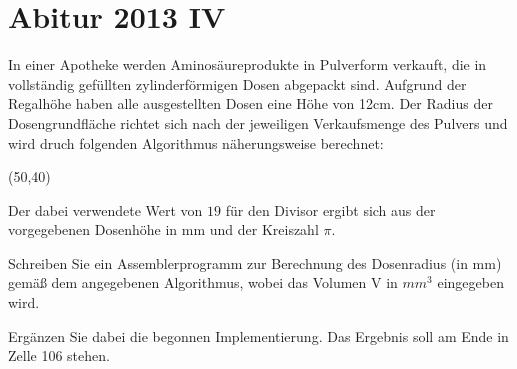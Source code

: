 \documentclass{lehramt-informatik-aufgabe}
\begin{document}

\section{Abitur 2013 IV}

In einer Apotheke werden Aminosäureprodukte in Pulverform verkauft, die
in vollständig gefüllten zylinderförmigen Dosen abgepackt sind. Aufgrund
der Regalhöhe haben alle ausgestellten Dosen eine Höhe von 12cm. Der
Radius der Dosengrundfläche richtet sich nach der jeweiligen
Verkaufsmenge des Pulvers und wird druch folgenden Algorithmus
näherungsweise berechnet:

\begin{struktogramm}(50,40)
  \whileend
{}
\end{struktogramm}

Der dabei verwendete Wert von $19$ für den Divisor ergibt sich aus der
vorgegebenen Dosenhöhe in mm und der Kreiszahl $\pi$.

Schreiben Sie ein Assemblerprogramm zur Berechnung des Dosenradius (in
mm) gemäß dem angegebenen Algorithmus, wobei das Volumen V in $mm^3$
eingegeben wird.

Ergänzen Sie dabei die begonnen Implementierung. Das Ergebnis soll am
Ende in Zelle 106 stehen.

\end{document}
